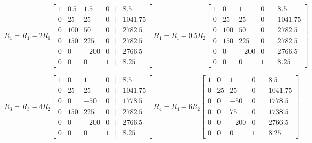 \documentclass[11pt]{article}
\begin{document}
\begin{enumerate}
\begin{enumerate}
\[
    R_1 = R_1 - 2R_6
    \begin{bmatrix}
        1 & 0.5 & 1.5 & 0 &|& 8.5 \\
        0 & 25 & 25 & 0 &|& 1041.75 \\
        0 & 100 & 50 & 0 &|& 2782.5 \\
        0 & 150 & 225 & 0 &|& 2782.5 \\
        0 & 0 & -200 & 0 &|& 2766.5 \\
        0 & 0 & 0 & 1 &|& 8.25
    \end{bmatrix}
    R_1 = R_1 - 0.5R_2
    \begin{bmatrix}
        1 & 0 & 1 & 0 &|& 8.5 \\
        0 & 25 & 25 & 0 &|& 1041.75 \\
        0 & 100 & 50 & 0 &|& 2782.5 \\
        0 & 150 & 225 & 0 &|& 2782.5 \\
        0 & 0 & -200 & 0 &|& 2766.5 \\
        0 & 0 & 0 & 1 &|& 8.25
    \end{bmatrix}
\]

\[
    R_3 = R_3 - 4R_2
    \begin{bmatrix}
        1 & 0 & 1 & 0 &|& 8.5 \\
        0 & 25 & 25 & 0 &|& 1041.75 \\
        0 & 0 & -50 & 0 &|& 1778.5 \\
        0 & 150 & 225 & 0 &|& 2782.5 \\
        0 & 0 & -200 & 0 &|& 2766.5 \\
        0 & 0 & 0 & 1 &|& 8.25
    \end{bmatrix}
    R_4 = R_4 - 6R_2
    \begin{bmatrix}
        1 & 0 & 1 & 0 &|& 8.5 \\
        0 & 25 & 25 & 0 &|& 1041.75 \\
        0 & 0 & -50 & 0 &|& 1778.5 \\
        0 & 0 & 75 & 0 &|& 1738.5 \\
        0 & 0 & -200 & 0 &|& 2766.5 \\
        0 & 0 & 0 & 1 &|& 8.25
    \end{bmatrix}
\]


\end{enumerate}
\end{enumerate}
\end{document}

